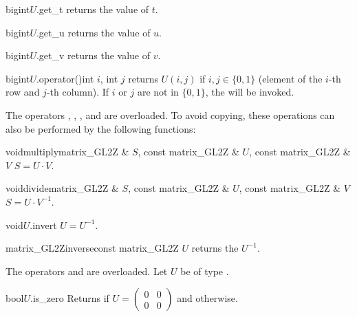 \begin{cfcode}{bigint}{$U$.get_t}{}
  returns the value of $t$.
\end{cfcode}

\begin{cfcode}{bigint}{$U$.get_u}{}
  returns the value of $u$.
\end{cfcode}

\begin{cfcode}{bigint}{$U$.get_v}{}
  returns the value of $v$.
\end{cfcode}

\begin{cfcode}{bigint}{$U$.operator()}{int $i$, int $j$}
  returns $U(i,j)$ if $i,j \in \{ 0, 1 \}$ (element of the $i$-th row and $j$-th column).  If $i$
  or $j$ are not in $\{ 0, 1 \}$, the \LEH will be invoked.
\end{cfcode}



\ARTH

The operators \code{*}, \code{/}, \code{*=}, and \code{/=} are overloaded.  To avoid copying,
these operations can also be performed by the following functions:

\begin{fcode}{void}{multiply}{matrix_GL2Z & $S$, const matrix_GL2Z & $U$, const matrix_GL2Z & $V$}
  $S = U \cdot V$.
\end{fcode}

\begin{fcode}{void}{divide}{matrix_GL2Z & $S$, const matrix_GL2Z & $U$, const matrix_GL2Z & $V$}
  $S = U \cdot V^{-1}$.
\end{fcode}

\begin{fcode}{void}{$U$.invert}{}
  $U = U^{-1}$.
\end{fcode}

\begin{fcode}{matrix_GL2Z}{inverse}{const matrix_GL2Z $U$}
  returns the $U^{-1}$.
\end{fcode}



\COMP

The operators \code{==} and \code{!=} are overloaded.  Let $U$ be of type .

\begin{cfcode}{bool}{$U$.is_zero}{}
  Returns \TRUE if $U = \begin{pmatrix} 0 & 0 \\ 0 & 0 \end{pmatrix}$ and \FALSE otherwise.
\end{cfcode}

